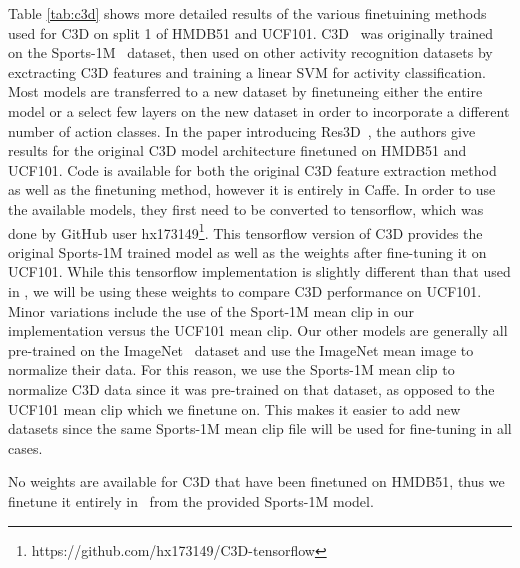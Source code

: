 \documentclass{llncs}
\begin{document}
Table \ref{tab:c3d} shows more detailed results of the various finetuining methods used for C3D on split 1 of HMDB51 and UCF101.
C3D~\cite{} was originally trained on the Sports-1M~\cite{} dataset, then used on other activity recognition datasets by exctracting C3D features and training a linear SVM for activity classification.
Most models are transferred to a new dataset by finetuneing either the entire model or a select few layers on the new dataset in order to incorporate a different number of action classes.
In the paper introducing Res3D~\cite{}, the authors give results for the original C3D model architecture finetuned on HMDB51 and UCF101.
Code is available for both the original C3D feature extraction method as well as the finetuning method, however it is entirely in Caffe.
In order to use the available models, they first need to be converted to tensorflow, which was done by GitHub user hx173149\footnote{https://github.com/hx173149/C3D-tensorflow}.
This tensorflow version of C3D provides the original Sports-1M trained model as well as the weights after fine-tuning it on UCF101.
While this tensorflow implementation is slightly different than that used in \acro, we will be using these weights to compare C3D performance on UCF101.
Minor variations include the use of the Sport-1M mean clip in our implementation versus the UCF101 mean clip.
Our other models are generally all pre-trained on the ImageNet~\cite{} dataset and use the ImageNet mean image to normalize their data.
For this reason, we use the Sports-1M mean clip to normalize C3D data since it was pre-trained on that dataset, as opposed to the UCF101 mean clip which we finetune on.
This makes it easier to add new datasets since the same Sports-1M mean clip file will be used for fine-tuning in all cases.

No weights are available for C3D that have been finetuned on HMDB51, thus we finetune it entirely in \acro~from the provided Sports-1M model.
\end{document}
